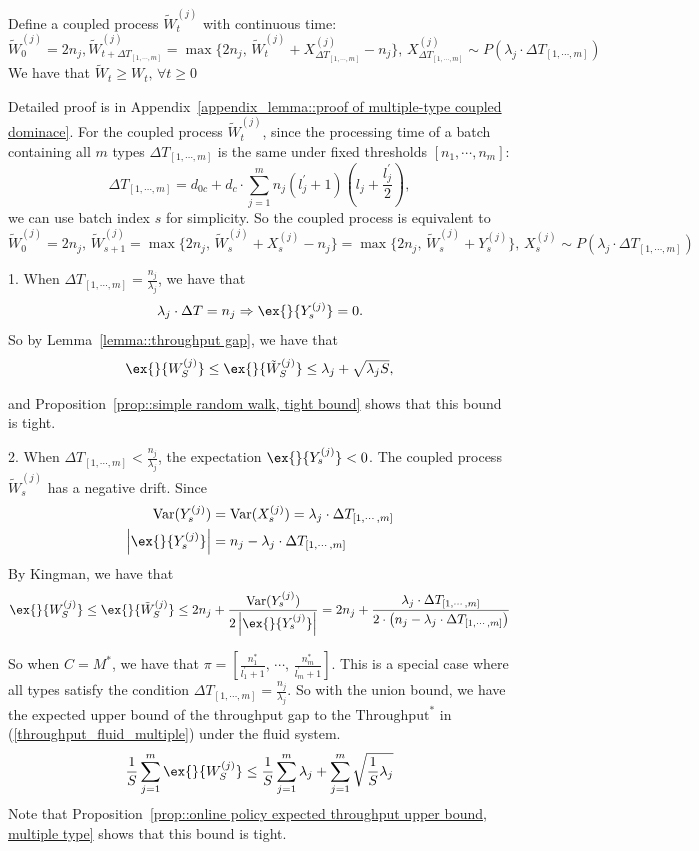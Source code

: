 \begin{lemma}\label{lemma::multiple-type coupled dominace}
Define a coupled process $\tilde{W}_t^{(j)}$ with continuous time:
$$\tilde{W}^{(j)}_0=2n_j, \tilde{W}^{(j)}_{t+\Delta T_{[1,\cdots,m]}}= \max\{ 2n_j,\, \tilde{W}^{(j)}_t +X^{(j)}_{\Delta T_{[1,\cdots,m]}}-n_j \},\, X_{\Delta T_{[1,\cdots,m]}}^{(j)} \sim P(\lambda_j\cdot \Delta T_{[1,\cdots,m]}) $$
We have that $\tilde{W}_t\geq W_t,\,\forall t\geq 0$
\end{lemma}
Detailed proof is in Appendix~\ref{appendix_lemma::proof of multiple-type coupled dominace}. For the coupled process $\tilde{W}_t^{(j)}$, since the processing time of a batch containing all $m$ types $\Delta T_{[1,\cdots,m]}$ is the same under fixed thresholds $[n_1,\cdots,n_m]$:
$$\Delta T_{[1,\cdots,m]} =  d_{0c} + d_c \cdot \sum_{j=1}^m n_j(l_j^\prime+1)\left( l_j+\frac{l_j^\prime}{2} \right) ,$$
we can use batch index $s$ for simplicity. So the coupled process is equivalent to
$$\tilde{W}_0^{(j)} = 2n_j,\, \tilde{W}_{s+1}^{(j)} = \max\{ 2n_j, \, \tilde{W}_s^{(j)}+X_s^{(j)} - n_j \}=\max\{ 2n_j, \, \tilde{W}_s^{(j)}+Y_s^{(j)} \},\, X_s^{(j)} \sim P(\lambda_j \cdot \Delta T_{[1,\cdots,m]})  $$

1. When $ \Delta T_{[1,\cdots,m]} = \frac{n_j}{\lambda_j}$, we have that
$$\lambda_j\cdot \Delta T = n_j\Rightarrow \ex{}{Y_s^{(j)}}=0.$$
So by Lemma~\ref{lemma::throughput gap}, we have that
$$\ex{}{W_S^{(j)}}\leq \ex{}{\tilde{W}_S^{(j)}}\leq \lambda_j + \sqrt{\lambda_j S}, $$

and Proposition~\ref{prop::simple random walk, tight bound} shows that this bound is tight.

2. When $\Delta T_{[1,\cdots,m]} < \frac{n_j}{\lambda_j}$, the expectation $\ex{}{Y_s^{(j)}}<0$. The coupled process $\tilde{W}_s^{(j)}$ has a negative drift. Since
\begin{align*}
\text{Var}(Y_s^{(j)} )&= \text{Var}(X_s^{(j)} )  = \lambda_j \cdot \Delta T_{[1,\cdots,m]}\\
\left| \ex{}{Y_s^{(j)}} \right| &= n_j - \lambda_j\cdot \Delta T_{[1,\cdots,m]}
\end{align*}
By Kingman, we have that
$$\ex{}{W_S^{(j)}}\leq \ex{}{\tilde{W}_S^{(j)}}\leq 2n_j + \frac{\text{Var}(Y_s^{(j)} )}{2\left| \ex{}{Y_s^{(j)}} \right| } =2n_j+ \frac{\lambda_j \cdot \Delta T_{[1,\cdots,m]}}{2\cdot\left(n_j - \lambda_j\cdot \Delta T_{[1,\cdots,m]}\right)}$$

So when $C = M^*$, we have that $\pi = [\frac{n_1^*}{l_1^\prime+1},\,\cdots,\, \frac{n_m^*}{l_m^\prime+1}]$. This is a special case where all types satisfy the condition $\Delta T_{[1,\cdots,m]} = \frac{n_j}{\lambda_j}$. So with the union bound, we have the expected upper bound of the throughput gap to the $\text{Throughput}^*$ in (\ref{throughput_fluid_multiple}) under the fluid system.
$$\frac{1}{S}\sum_{j=1}^m \ex{}{W_S^{(j)}}\leq \frac{1}{S}\sum_{j=1}^m \lambda_j +\sum_{j=1}^m \sqrt{\frac{1}{S}\lambda_j} $$
Note that Proposition~\ref{prop::online policy expected throughput upper bound, multiple type} shows that this bound is tight.

